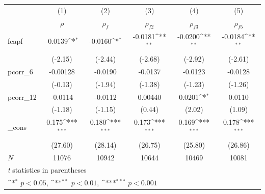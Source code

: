 \documentclass[12pt]{article}
\begin{document}
\begin{table}[htbp]
\centering
{
\def\sym#1{\ifmmode^{#1}\else\(^{#1}\)\fi}
\begin{tabular}{l*{5}{c}}
\hline\hline
            &\multicolumn{1}{c}{(1)}&\multicolumn{1}{c}{(2)}&\multicolumn{1}{c}{(3)}&\multicolumn{1}{c}{(4)}&\multicolumn{1}{c}{(5)}\\
            &\multicolumn{1}{c}{$ \rho $}&\multicolumn{1}{c}{$ \rho_f $}&\multicolumn{1}{c}{$ \rho_{f2} $}&\multicolumn{1}{c}{$  \rho_{f3} $}&\multicolumn{1}{c}{$ \rho_{f5} $}\\
\hline
fcapf       &     -0.0139\sym{*}  &     -0.0160\sym{*}  &     -0.0181\sym{**} &     -0.0200\sym{**} &     -0.0184\sym{**} \\
            &     (-2.15)         &     (-2.44)         &     (-2.68)         &     (-2.92)         &     (-2.61)         \\
[1em]
pcorr\_6     &    -0.00128         &     -0.0190         &     -0.0137         &     -0.0123         &     -0.0128         \\
            &     (-0.13)         &     (-1.94)         &     (-1.38)         &     (-1.23)         &     (-1.26)         \\
[1em]
pcorr\_12    &     -0.0114         &     -0.0112         &     0.00440         &      0.0201\sym{*}  &      0.0110         \\
            &     (-1.18)         &     (-1.15)         &      (0.44)         &      (2.02)         &      (1.09)         \\
[1em]
\_cons      &       0.175\sym{***}&       0.180\sym{***}&       0.173\sym{***}&       0.169\sym{***}&       0.178\sym{***}\\
            &     (27.60)         &     (28.14)         &     (26.75)         &     (25.80)         &     (26.86)         \\
\hline
\(N\)       &       11076         &       10942         &       10644         &       10469         &       10081         \\
\hline\hline
\multicolumn{6}{l}{\footnotesize \textit{t} statistics in parentheses}\\
\multicolumn{6}{l}{\footnotesize \sym{*} \(p<0.05\), \sym{**} \(p<0.01\), \sym{***} \(p<0.001\)}\\
\end{tabular}
}

\end{table}
\end{document}
